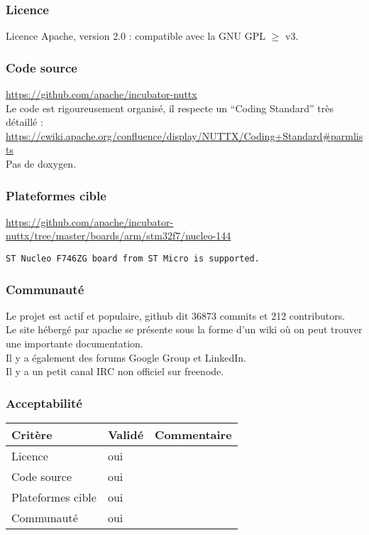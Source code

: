 \subsubsection{Licence}
Licence Apache, version 2.0 : compatible avec la GNU GPL $ \geqslant $ v3.

\subsubsection{Code source}
\url{https://github.com/apache/incubator-nuttx}\\

Le code est rigoureusement organisé, il respecte un \enquote{Coding Standard} très 
détaillé :
\url{https://cwiki.apache.org/confluence/display/NUTTX/Coding+Standard#parmlists}\\

Pas de doxygen.

\subsubsection{Plateformes cible}
{\small
\url{https://github.com/apache/incubator-nuttx/tree/master/boards/arm/stm32f7/nucleo-144}
}
\begin{verbatim}
ST Nucleo F746ZG board from ST Micro is supported.
\end{verbatim}

\subsubsection{Communauté}
Le projet est actif et populaire, github dit 36873 commits et 212 contributors.\\

Le site hébergé par apache se présente sous la forme d'un wiki où on peut trouver
une importante documentation.\\

Il y a également des forums Google Group et LinkedIn.\\

Il y a un petit canal IRC non officiel sur freenode.

\subsubsection{Acceptabilité}
\begin{tabular}{lll}
\toprule
	Critère				&	Validé		&	Commentaire	\\
\midrule
	Licence				&	oui			&		\\
	Code source			&	oui			&		\\
	Plateformes cible	&	oui			&		\\
	Communauté			&	oui			&		\\
\bottomrule
\end{tabular}

